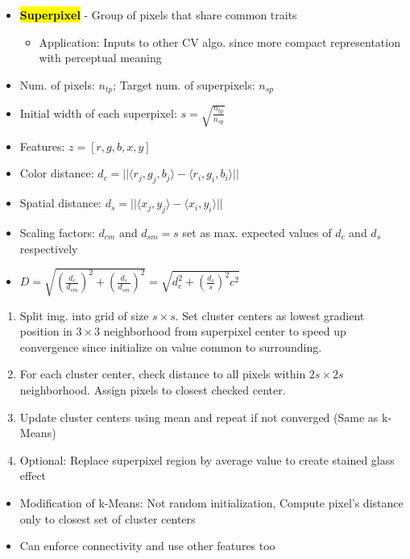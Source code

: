 \documentclass{article}
\newcommand{\keyword}[2]{\sethlcolor{highlight}\hl{\textbf{#1}} - #2}
\begin{document}
\begin{multicols*}{4}
\begin{itemize}
\begin{itemize}
        \item \keyword{Superpixel}{Group of pixels that share common traits}
        \begin{itemize}
            \item Application: Inputs to other CV algo. since more compact representation with perceptual meaning
        \end{itemize}
        \item Num. of pixels: $n_{tp}$; Target num. of superpixels: $n_{sp}$
        \item Initial width of each superpixel: $s = \sqrt{\frac{n_{tp}}{n_{sp}}}$
        \item Features: $z = [r,g,b,x,y]$
        \item Color distance: $d_c = || \langle r_j,g_j,b_j \rangle - \langle r_i,g_i,b_i \rangle ||$
        \item Spatial distance: $d_s = || \langle x_j,y_j \rangle - \langle x_i,y_i \rangle ||$
        \item Scaling factors: $d_{cm}$ and $d_{sm}=s$ set as max. expected values of $d_c$ and $d_s$ respectively
        \item $D = \sqrt{(\frac{d_c}{d_{cm}})^2+(\frac{d_s}{d_{sm}})^2} = \sqrt{d_c^2 + (\frac{d_s}{s})^2 c^2}$
    \end{itemize}
    \begin{enumerate}
        \item Split img. into grid of size $s \times s$. Set cluster centers as lowest gradient position in $3 \times 3$ neighborhood from superpixel center to speed up convergence since initialize on value common to surrounding.
        \item For each cluster center, check distance to all pixels within $2s \times 2s$ neighborhood. Assign pixels to closest checked center.
        \item Update cluster centers using mean and repeat if not converged (Same as k-Means)
        \item Optional: Replace superpixel region by average value to create stained glass effect
    \end{enumerate}
    \begin{itemize}
        \item Modification of k-Means: Not random initialization, Compute pixel's distance only to closest set of cluster centers
        \item Can enforce connectivity and use other features too
    \end{itemize}

\end{itemize}
\end{multicols*}
\end{document}
